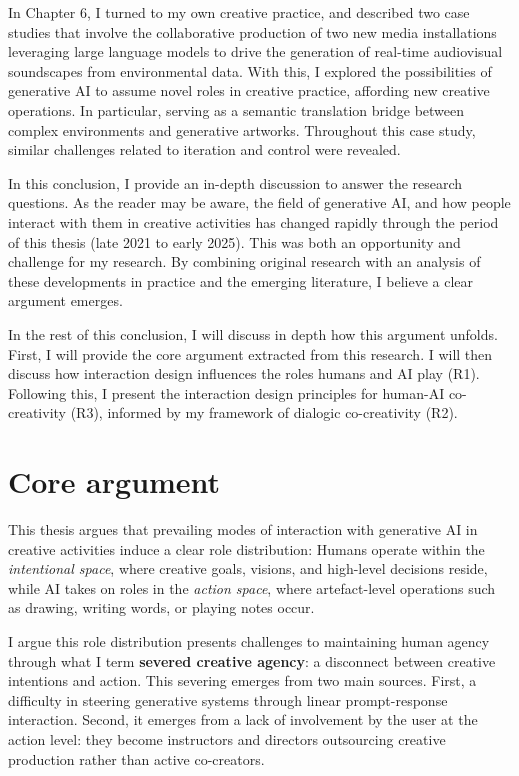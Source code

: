 In Chapter 6, I turned to my own creative practice, and described two case studies that involve the collaborative production of two new media installations leveraging large language models to drive the generation of real-time audiovisual soundscapes from environmental data. With this, I explored the possibilities of generative AI to assume novel roles in creative practice, affording new creative operations. In particular, serving as a semantic translation bridge between complex environments and generative artworks. Throughout this case study, similar challenges related to iteration and control were revealed.

In this conclusion, I provide an in-depth discussion to answer the research questions. As the reader may be aware, the field of generative AI, and how people interact with them in creative activities has changed rapidly through the period of this thesis (late 2021 to early 2025). This was both an opportunity and challenge for my research. By combining original research with an analysis of these developments in practice and the emerging literature, I believe a clear argument emerges.

In the rest of this conclusion, I will discuss in depth how this argument unfolds. First, I will provide the core argument extracted from this research. I will then discuss how interaction design influences the roles humans and AI play (R1). Following this, I present the interaction design principles for human-AI co-creativity (R3), informed by my framework of dialogic co-creativity (R2).


\section{Core argument}

This thesis argues that prevailing modes of interaction with generative AI in creative activities induce a clear role distribution: Humans operate within the \textit{intentional space}, where creative goals, visions, and high-level decisions reside, while AI takes on roles in the \textit{action space}, where artefact-level operations such as drawing, writing words, or playing notes occur.

I argue this role distribution presents challenges to maintaining human agency through what I term \textbf{severed creative agency}: a disconnect between creative intentions and action. This severing emerges from two main sources. First, a difficulty in steering generative systems through linear prompt-response interaction. Second, it emerges from a lack of involvement by the user at the action level: they become instructors and directors outsourcing creative production rather than active co-creators.

